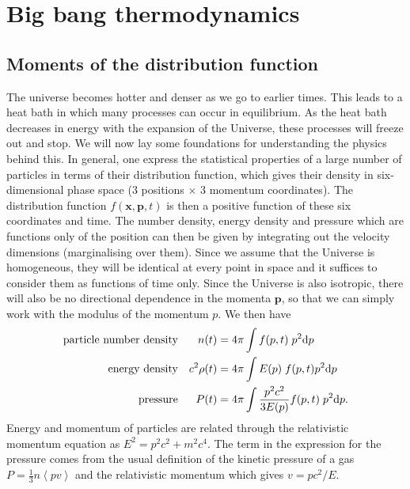 \documentclass[a4paper]{article}
\begin{document}
\section{Big bang thermodynamics}
\subsection{Moments of the distribution function}
The universe becomes hotter and denser as we go to earlier times. This leads to a heat bath in which many processes can occur in equilibrium. As the heat bath decreases in energy with the expansion of the Universe, these processes will freeze out and stop. We will now lay some foundations for understanding the physics behind this. In general, one express the statistical properties of a large number of particles in terms of their distribution function, which gives their density in six-dimensional phase space (3 positions $\times$ 3 momentum coordinates). The distribution function $f(\mathbf{x},\mathbf{p},t)$ is then a positive function of these six coordinates and time. The number density, energy density and pressure which are functions only of the position can then be given by integrating out the velocity dimensions (marginalising over them). Since we assume that the Universe is homogeneous, they will be identical at every point in space and it suffices to consider them as functions of time only. Since the Universe is also isotropic, there will also be no directional dependence in the momenta $\mathbf{p}$, so that we can simply work with the modulus of the momentum $p$. We then have
\begin{align}
\text{particle number density} && n(t) & =  4\pi \int f(p,t) \;p^2 {\rm d}p \\
\text{energy density} && c^2\rho(t) & = 4\pi\int E(p) \;f(p,t) p^2 {\rm d}p \\
\text{pressure} && P(t) & =  4\pi \int \frac{p^2 c^2}{3E(p)} f(p,t) \;p^2 {\rm d}p.
\end{align}
Energy and momentum of particles are related through the relativistic momentum equation as $E^2 = p^2c^2+m^2c^4$. The term in the expression for the pressure comes from the usual definition of the kinetic pressure of a gas $P=\frac{1}{3}n\left<p v\right>$ and the relativistic momentum which gives $v = p c^2/E$.
\end{document}
